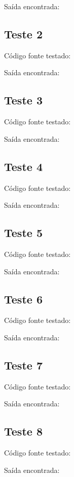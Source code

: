 \documentclass[11pt]{article}
\begin{document}
		Saída encontrada:
		
	
	
	\subsection{Teste 2}
		
		Código fonte testado:
		
			
		Saída encontrada:
		


	\subsection{Teste 3}
	
		Código fonte testado:
		
			
		Saída encontrada:
		


	\subsection{Teste 4}
	
		Código fonte testado:
		
			
		Saída encontrada:
		
		
	
	\subsection{Teste 5}
	
		Código fonte testado:
		
			
		Saída encontrada:
		

	\newpage
	\subsection{Teste 6}
	
		Código fonte testado:
		
			
		Saída encontrada:
		

	\newpage
	\subsection{Teste 7}
	
		Código fonte testado:
		
			
		Saída encontrada:
		


	\subsection{Teste 8}
	
		Código fonte testado:
		
		
		Saída encontrada:
		
\end{document}
